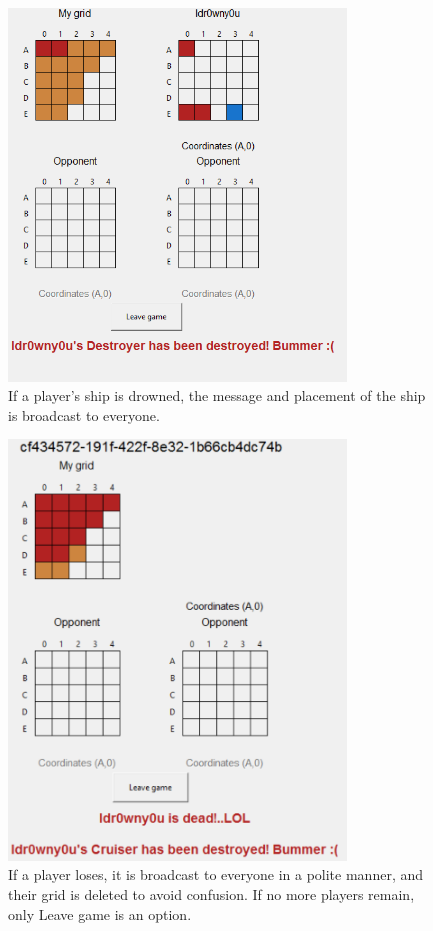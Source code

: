\documentclass[]{article}
\begin{document}
\begin{figure}[!hbt]
	\centering
	\includegraphics[width=0.8\textwidth]{ShipDown.png}
	\caption{If a player's ship is drowned, the message and placement of the ship is broadcast to everyone.}
	\label{fig:Shipdown}
\end{figure}

\begin{figure}[!hbt]
	\centering
	\includegraphics[width=0.8\textwidth]{PlayLost.png}
	\caption{If a player loses, it is broadcast to everyone in a polite manner, and their grid is deleted to avoid confusion. If no more players remain, only Leave game is an option.}
	\label{fig:Playlost}
\end{figure}
\end{document}

